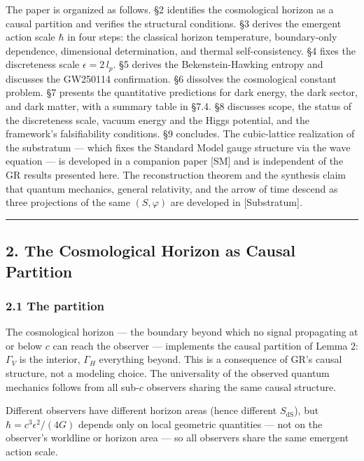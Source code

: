 \documentclass[
]{article}
\begin{document}
The paper is organized as follows. §2 identifies the cosmological
horizon as a causal partition and verifies the structural conditions. §3
derives the emergent action scale \(\hbar\) in four steps: the classical
horizon temperature, boundary-only dependence, dimensional
determination, and thermal self-consistency. §4 fixes the discreteness
scale \(\epsilon = 2\,l_p\). §5 derives the Bekenstein-Hawking entropy
and discusses the GW250114 confirmation. §6 dissolves the cosmological
constant problem. §7 presents the quantitative predictions for dark
energy, the dark sector, and dark matter, with a summary table in §7.4.
§8 discusses scope, the status of the discreteness scale, vacuum energy
and the Higgs potential, and the framework's falsifiability conditions.
§9 concludes. The cubic-lattice realization of the substratum --- which
fixes the Standard Model gauge structure via the wave equation --- is
developed in a companion paper {[}SM{]} and is independent of the GR
results presented here. The reconstruction theorem and the synthesis
claim that quantum mechanics, general relativity, and the arrow of time
descend as three projections of the same \((S, \varphi)\) are developed
in {[}Substratum{]}.

\begin{center}\rule{0.5\linewidth}{0.5pt}\end{center}

\hypertarget{the-cosmological-horizon-as-causal-partition}{%
\subsection{2. The Cosmological Horizon as Causal
Partition}\label{the-cosmological-horizon-as-causal-partition}}

\hypertarget{the-partition}{%
\subsubsection{2.1 The partition}\label{the-partition}}

The cosmological horizon --- the boundary beyond which no signal
propagating at or below \(c\) can reach the observer --- implements the
causal partition of Lemma 2: \(\Gamma_V\) is the interior, \(\Gamma_H\)
everything beyond. This is a consequence of GR's causal structure, not a
modeling choice. The universality of the observed quantum mechanics
follows from all sub-\(c\) observers sharing the same causal structure.

Different observers have different horizon areas (hence different
\(S_{\text{dS}}\)), but \(\hbar = c^3 \epsilon^2/(4G)\) depends only on
local geometric quantities --- not on the observer's worldline or
horizon area --- so all observers share the same emergent action scale.
\end{document}
